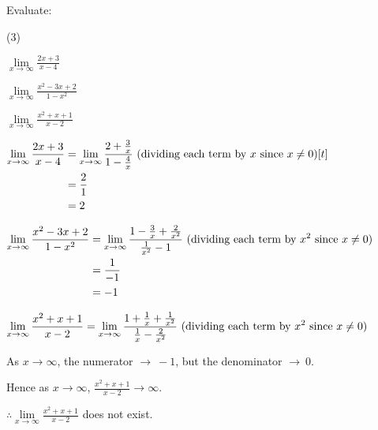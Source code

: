 \documentclass[11pt,a4paper]{book}
\begin{document}
\begin{example}

Evaluate:

\begin{tasks}[label=(\alph*),label-width=3.5ex] (3)

\task  ${\displaystyle \mathop{\lim}\limits _{x\to\infty}\frac{2x+3}{x-4}}$

\task  ${\displaystyle \mathop{\lim}\limits _{x\to\infty}\frac{x^{2}-3x+2}{1-x^{2}}}$

\task  ${\displaystyle \mathop{\lim}\limits _{x\to\infty}\frac{x^{2}+x+1}{x-2}}$

\end{tasks}

\Solution

\begin{tasks}[label=(\alph*),label-width=3.5ex]

\task
$
\begin{aligned}[t]
\mathop{\lim}\limits _{x\to\infty}\frac{2x+3}{x-4} & ={\displaystyle \mathop{\lim}\limits _{x\to\infty}\frac{2+\frac{3}{x}}{1-\frac{4}{x}}\text{ (dividing each term by \ensuremath{x} since \ensuremath{x\neq0})}}\\
 & =\frac{2}{1}\\
 & =2
\end{aligned}[t]
$

\task
$
\begin{aligned}[t]
\mathop{\lim}\limits _{x\to\infty}\frac{x^{2}-3x+2}{1-x^{2}} & =\mathop{\lim}\limits _{x\to\infty}\frac{1-\frac{3}{x}+\frac{2}{x^{2}}}{\frac{1}{x^{2}}-1}\text{ (dividing each term by \ensuremath{x^{2}} since \ensuremath{x\neq0})}\\
 & =\frac{1}{-1}\\
 & =-1
\end{aligned}
$

\task
$
\begin{aligned}[t]
\mathop{\lim}\limits _{x\to\infty}\frac{x^{2}+x+1}{x-2}=\mathop{\lim}\limits _{x\to\infty}\frac{1+\frac{1}{x}+\frac{1}{x^{2}}}{\frac{1}{x}-\frac{2}{x^{2}}}\text{ (dividing each term by \ensuremath{x^{2}} since \ensuremath{x\neq0})}
\end{aligned}
$

As $x\to\infty$, the numerator $\to\:-1$, but the denominator $\to\:0$.

Hence as $x\to\infty$, ${\displaystyle \frac{x^{2}+x+1}{x-2}\to\infty}$.

${\displaystyle \therefore\mathop{\lim}\limits _{x\to\infty}\frac{x^{2}+x+1}{x-2}}$
does not exist.

\end{tasks}

\end{example}
\end{document}
